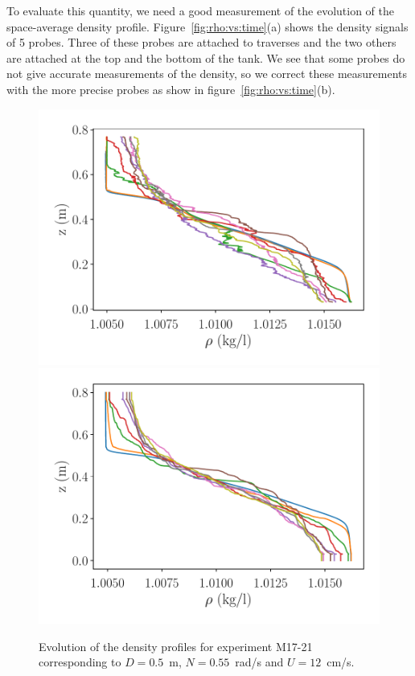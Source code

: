 To evaluate this quantity, we need a good measurement of the evolution of the
space-average density profile. Figure~\ref{fig:rho:vs:time}(a) shows the
density signals of 5 probes. Three of these probes are attached to traverses
and the two others are attached at the top and the bottom of the tank. We see
that some probes do not give accurate measurements of the density, so we
correct these measurements with the more precise probes as show in
figure~\ref{fig:rho:vs:time}(b).

\begin{figure}[htp!]
\includegraphics[width=\figwidth]{tmp/fig_profiles_mixing}\\
\includegraphics[width=\figwidth]{tmp/fig_profiles_probe_averaged}
\label{fig:profiles:mixing}

\caption{Evolution of the density profiles for experiment M17-21 corresponding
to $D = 0.5$~m, $N=0.55$~rad/s and $U=12$~cm/s.}

\end{figure}

